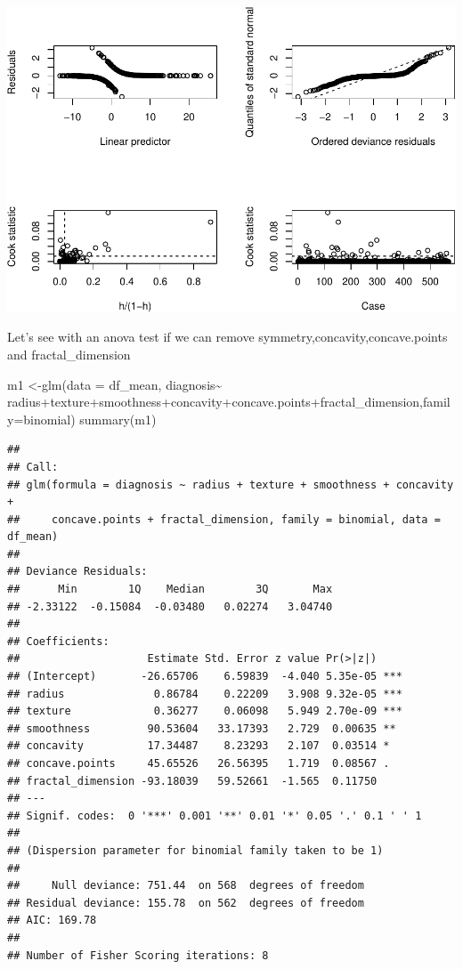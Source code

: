 \documentclass[
  11pt,
]{article}
\newenvironment{Shaded}{\begin{snugshade}}{\end{snugshade}}
\newcommand{\AttributeTok}[1]{\textcolor[rgb]{0.77,0.63,0.00}{#1}}
\newcommand{\FunctionTok}[1]{\textcolor[rgb]{0.00,0.00,0.00}{#1}}
\newcommand{\NormalTok}[1]{#1}
\newcommand{\OtherTok}[1]{\textcolor[rgb]{0.56,0.35,0.01}{#1}}
\newcommand{\SpecialCharTok}[1]{\textcolor[rgb]{0.00,0.00,0.00}{#1}}
\begin{document}
\includegraphics{stat_DAP_files/figure-latex/unnamed-chunk-14-1.pdf}

Let's see with an anova test if we can remove
symmetry,concavity,concave.points and fractal\_dimension

\begin{Shaded}
\begin{Highlighting}[]
\NormalTok{m1 }\OtherTok{\textless{}{-}}\FunctionTok{glm}\NormalTok{(}\AttributeTok{data =}\NormalTok{ df\_mean, diagnosis}\SpecialCharTok{\textasciitilde{}}\NormalTok{ radius}\SpecialCharTok{+}\NormalTok{texture}\SpecialCharTok{+}\NormalTok{smoothness}\SpecialCharTok{+}\NormalTok{concavity}\SpecialCharTok{+}\NormalTok{concave.points}\SpecialCharTok{+}\NormalTok{fractal\_dimension,}\AttributeTok{family=}\NormalTok{binomial)}
\FunctionTok{summary}\NormalTok{(m1)}
\end{Highlighting}
\end{Shaded}

\begin{verbatim}
## 
## Call:
## glm(formula = diagnosis ~ radius + texture + smoothness + concavity + 
##     concave.points + fractal_dimension, family = binomial, data = df_mean)
## 
## Deviance Residuals: 
##      Min        1Q    Median        3Q       Max  
## -2.33122  -0.15084  -0.03480   0.02274   3.04740  
## 
## Coefficients:
##                    Estimate Std. Error z value Pr(>|z|)    
## (Intercept)       -26.65706    6.59839  -4.040 5.35e-05 ***
## radius              0.86784    0.22209   3.908 9.32e-05 ***
## texture             0.36277    0.06098   5.949 2.70e-09 ***
## smoothness         90.53604   33.17393   2.729  0.00635 ** 
## concavity          17.34487    8.23293   2.107  0.03514 *  
## concave.points     45.65526   26.56395   1.719  0.08567 .  
## fractal_dimension -93.18039   59.52661  -1.565  0.11750    
## ---
## Signif. codes:  0 '***' 0.001 '**' 0.01 '*' 0.05 '.' 0.1 ' ' 1
## 
## (Dispersion parameter for binomial family taken to be 1)
## 
##     Null deviance: 751.44  on 568  degrees of freedom
## Residual deviance: 155.78  on 562  degrees of freedom
## AIC: 169.78
## 
## Number of Fisher Scoring iterations: 8
\end{verbatim}
\end{document}
